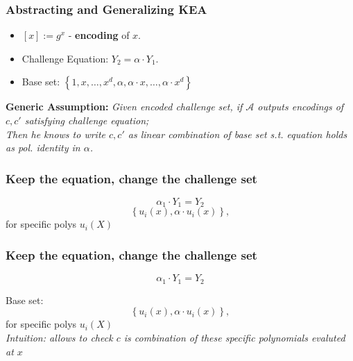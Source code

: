 \documentclass[shadesubsections,trans,14pt,mathserif]{beamer}
\newcommand{\adv}{\ensuremath{\mathcal A}}
\newcommand{\set}[1]{\ensuremath{\left\{#1\right\}}}
\begin{document}
\begin{frame}
 \frametitle{Abstracting and Generalizing KEA}
 \begin{itemize}
  \item $[x]:=g^x$ -  \textbf{encoding} of $x$.
  \vspace{0.2in}
  \item Challenge Equation: $Y_2=\alpha\cdot Y_1$.
   \vspace{0.2in}
\item Base set: $\set{1,x,\ldots,x^d,\alpha,\alpha\cdot x,\ldots,\alpha\cdot x^d}$
 \end{itemize}
\vspace{0.3in}
 \textbf{Generic Assumption:} \emph{Given encoded challenge set, if $\adv$ outputs encodings of $c,c'$ satisfying challenge equation;\\
 Then he knows to write $c,c'$ as linear combination of base set s.t. equation holds as pol. identity in $\alpha$.}
 \end{frame}


 \begin{frame}
 \frametitle{Keep the equation, change the challenge set}
 
 \[\alpha_1 \cdot Y_1  = Y_{2}\]
  \vspace{0.3in}
\[\set{u_i(x),\alpha\cdot u_i(x)},\]
for specific polys $u_i(X)$\\
 
 
 
 \end{frame}

 
 
 \begin{frame}
 \frametitle{Keep the equation, change the challenge set}
 
 \[\alpha_1 \cdot Y_1  = Y_{2}\]
  \vspace{0.3in}
  
  Base set:
\[\set{u_i(x),\alpha\cdot u_i(x)},\]
for specific polys $u_i(X)$\\
  \vspace{0.3in}
  \emph{Intuition: allows to check $c$ is combination of these specific polynomials evaluted at $x$}
  
  
  
  

 
 
 \end{frame}
 
\end{document}
